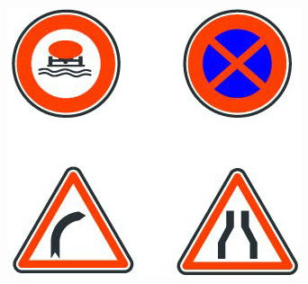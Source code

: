 \begin{pageAuto}
 
\begin{center}
 \includegraphics[scale=0.55]{FIG/panneaux4.jpg} 
\end{center}
 





\end{pageAuto}



